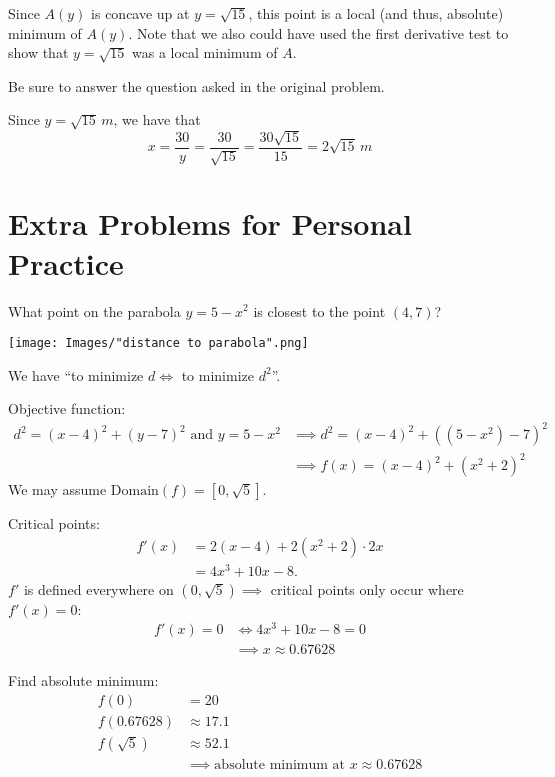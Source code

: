 \documentclass[nooutcomes]{ximera}
\renewenvironment{freeResponse}{
\ifhandout\setbox0\vbox\bgroup\else
\begin{trivlist}\item[\hskip \labelsep\bfseries Solution:\hspace{2ex}]
\fi}
{\ifhandout\egroup\else
\end{trivlist}
\fi}
\begin{document}
\begin{problem}
\begin{enumerate}
\begin{freeResponse}
        Since $A(y)$ is concave up at $y=\sqrt{15}$, this point is a local (and thus, absolute) minimum of $A(y)$.  
        Note that we also could have used the first derivative test to show that $y=\sqrt{15}$ was a local minimum of $A$.
      \end{freeResponse}
      
    \item  Be sure to answer the question asked in the original problem.
      \begin{freeResponse}
        Since $y=\sqrt{15} \, m$, we have that
        $$ x = \frac{30}{y} = \frac{30}{\sqrt{15}} = \frac{30 \sqrt{15}}{15} = 2 \sqrt{15} \, m $$
      \end{freeResponse}
    \end{enumerate}
\end{problem}

\section{Extra Problems for Personal Practice}
\begin{problem}
  What point on the parabola $y=5-x^2$ is closest to the point $(4,7)$?
  \begin{freeResponse}
    \begin{image}
      \texttt{[image: Images/"distance to parabola".png]}
    \end{image}

    We have ``to minimize $d \iff$ to minimize $d^2$''.

    Objective function:
    \begin{align*}
      d^2 = (x-4)^2 + (y-7)^2 \mbox{ and } y = 5 - x^2 &\implies d^2 = (x-4)^2 + \left((5 - x^2) -7 \right)^2\\
      &\implies f(x) = (x-4)^2 + (x^2 + 2)^2
    \end{align*}
    We may assume $\mbox{Domain}(f) = [0, \sqrt{5}]$.

    Critical points:
    \begin{align*}
      f'(x) &= 2(x-4) + 2(x^2 + 2) \cdot 2x\\
      &= 4x^3 + 10x - 8.
    \end{align*}
    $f'$ is defined everywhere on $(0, \sqrt{5}) \implies$ critical points only occur where $f'(x) = 0$:
    \begin{align*}
      f'(x) = 0 &\iff 4x^3 + 10x - 8 = 0\\
      &\implies x \approx 0.67628
    \end{align*}

    Find absolute minimum:
    \begin{align*}
      f(0) &= 20\\
      f(0.67628) &\approx 17.1\\
      f(\sqrt{5}) &\approx 52.1\\
      &\implies \mbox{absolute minimum at $x \approx 0.67628$}
    \end{align*}
  \end{freeResponse}
\end{problem}
\end{document}
